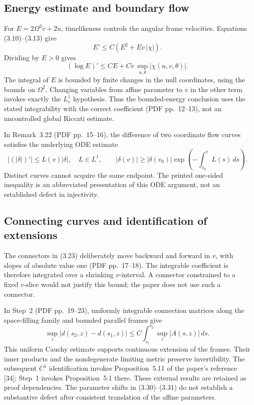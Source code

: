 \documentclass[10pt]{article}
\begin{document}
\subsection*{Energy estimate and boundary flow}
For \(E=2\Omega^2\dot v+2\dot u\), timelikeness controls the angular frame velocities. Equations (3.10)–(3.13) give \[E'\le C(E^2+E\dot v\,|\chi|).\] Dividing by \(E>0\) gives \[(\log E)'\le C E+C\dot v\,\sup_{u,\theta}|\chi(u,v,\theta)|.\] The integral of \(E\) is bounded by finite changes in the null coordinates, using the bounds on \(\Omega^2\). Changing variables from affine parameter to \(v\) in the other term invokes exactly the \(L^1_v\) hypothesis. Thus the bounded-energy conclusion uses the stated integrability with the correct coefficient (PDF pp. 12–13), not an uncontrolled global Riccati estimate.\par
In Remark 3.22 (PDF pp. 15–16), the difference of two coordinate flow curves satisfies the underlying ODE estimate \[|(|\delta|)'|\le L(v)|\delta|,\quad L\in L^1,\qquad
 |\delta(v)|\ge|\delta(v_0)|\exp\!\left(-\int_{v_0}^{v}L(s)\,ds\right).\] Distinct curves cannot acquire the same endpoint. The printed one-sided inequality is an abbreviated presentation of this ODE argument, not an established defect in injectivity.\par
\subsection*{Connecting curves and identification of extensions}
The connectors in (3.23) deliberately move backward and forward in \(v\), with slopes of absolute value one (PDF pp. 17–18). The integrable coefficient is therefore integrated over a shrinking \(v\)-interval. A connector constrained to a fixed \(v\)-slice would not justify this bound; the paper does not use such a connector.\par
In Step 2 (PDF pp. 19–23), uniformly integrable connection matrices along the space-filling family and bounded parallel frames give \[\sup_z|d(s_2,z)-d(s_1,z)|
 \le C\int_{s_1}^{s_2}\sup_z|A(s,z)|\,ds .\] This uniform Cauchy estimate supports continuous extension of the frames. Their inner products and the nondegenerate limiting metric preserve invertibility. The subsequent \(C^1\) identification invokes Proposition 5.11 of the paper’s reference [34]; Step 1 invokes Proposition 5.1 there. These external results are retained as proof dependencies. The parameter shifts in (3.30)–(3.31) do not establish a substantive defect after consistent translation of the affine parameters.\par
\end{document}
